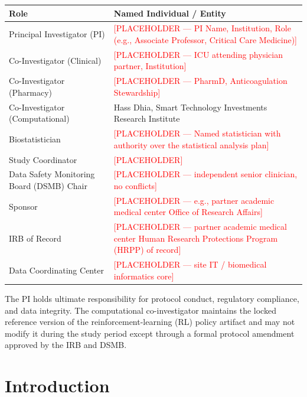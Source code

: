 \documentclass[11pt]{article}
\begin{document}
\begin{longtable}{@{}p{4.5cm}p{10.5cm}@{}}
\toprule
\textbf{Role} & \textbf{Named Individual / Entity} \\
\midrule
\endhead
Principal Investigator (PI) & \textcolor{red}{[PLACEHOLDER --- PI Name, Institution, Role (e.g., Associate Professor, Critical Care Medicine)]} \\
Co-Investigator (Clinical) & \textcolor{red}{[PLACEHOLDER --- ICU attending physician partner, Institution]} \\
Co-Investigator (Pharmacy) & \textcolor{red}{[PLACEHOLDER --- PharmD, Anticoagulation Stewardship]} \\
Co-Investigator (Computational) & Hass Dhia, Smart Technology Investments Research Institute \\
Biostatistician & \textcolor{red}{[PLACEHOLDER --- Named statistician with authority over the statistical analysis plan]} \\
Study Coordinator & \textcolor{red}{[PLACEHOLDER]} \\
Data Safety Monitoring Board (DSMB) Chair & \textcolor{red}{[PLACEHOLDER --- independent senior clinician, no conflicts]} \\
Sponsor & \textcolor{red}{[PLACEHOLDER --- e.g., partner academic medical center Office of Research Affairs]} \\
IRB of Record & \textcolor{red}{[PLACEHOLDER --- partner academic medical center Human Research Protections Program (HRPP) of record]} \\
Data Coordinating Center & \textcolor{red}{[PLACEHOLDER --- site IT / biomedical informatics core]} \\
\bottomrule
\end{longtable}

The PI holds ultimate responsibility for protocol conduct, regulatory compliance, and data integrity. The computational co-investigator maintains the locked reference version of the reinforcement-learning (RL) policy artifact and may not modify it during the study period except through a formal protocol amendment approved by the IRB and DSMB.

\section{Introduction}
\label{sec:intro}
\end{document}
